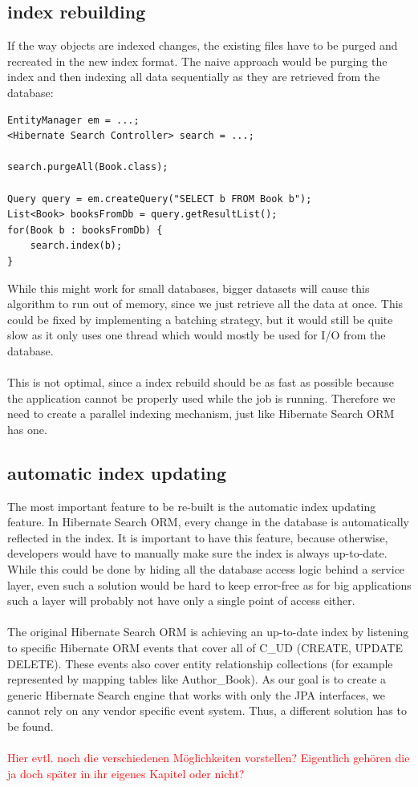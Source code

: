 \subsection{index rebuilding}
If the way objects are indexed changes, the existing files have to be purged and recreated in the new index format. The naive approach would be purging the index and then indexing all data sequentially as they are retrieved from the database:
\\
\lstset{language=java}
\begin{lstlisting}[frame=htrbl, caption={naive index rebuilding}, label={lst:naiveIndexing}]
EntityManager em = ...;
<Hibernate Search Controller> search = ...;

search.purgeAll(Book.class);

Query query = em.createQuery("SELECT b FROM Book b");
List<Book> booksFromDb = query.getResultList();
for(Book b : booksFromDb) {
	search.index(b);
}
\end{lstlisting}
While this might work for small databases, bigger datasets will cause this algorithm to run out of memory, since we just retrieve all the data at once. This could be fixed by implementing a batching strategy, but it would still be quite slow as it only uses one thread which would mostly be used for I/O from the database.
\\\\
This is not optimal, since a index rebuild should be as fast as possible because the application cannot be properly used while the job is running. Therefore we need to create a parallel indexing mechanism, just like Hibernate Search ORM has one.

\subsection{automatic index updating}
The most important feature to be re-built is the automatic index updating feature. In Hibernate Search ORM, every change in the database is automatically reflected in the index. It is important to have this feature, because otherwise, developers would have to manually make sure the index is always up-to-date. While this could be done by hiding all the database access logic behind a service layer, even such a solution would be hard to keep error-free as for big applications such a layer will probably not have only a single point of access either.
\\\\
The original Hibernate Search ORM is achieving an up-to-date index by listening to specific Hibernate ORM events that cover all of C\_UD (CREATE, UPDATE DELETE). These events also cover entity relationship collections (for example represented by mapping tables like Author\_Book). As our goal is to create a generic Hibernate Search engine that works with only the JPA interfaces, we cannot rely on any vendor specific event system. Thus, a different solution has to be found.
\\\\
\textcolor{red}{Hier evtl. noch die verschiedenen Möglichkeiten vorstellen? Eigentlich gehören die ja doch später in ihr eigenes Kapitel oder nicht?}

\pagebreak